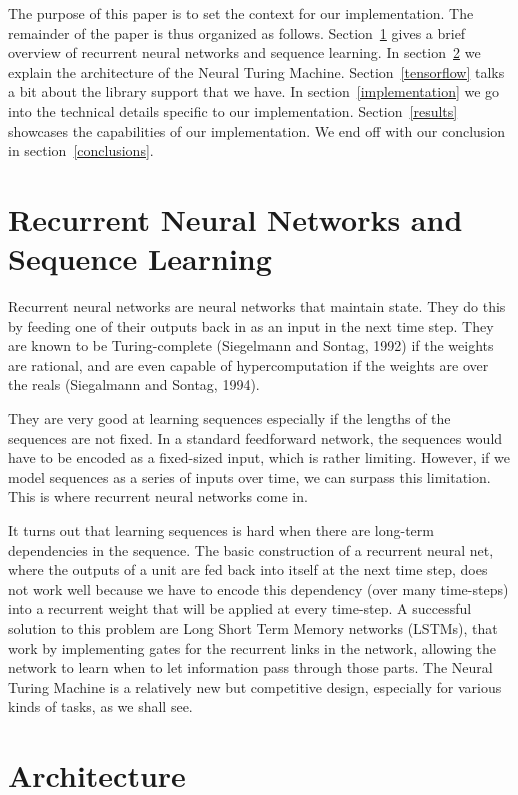 \documentclass[12pt]{article}
\begin{document}
The purpose of this paper is to set the context for our implementation.
The remainder of the paper is thus organized as follows.
Section~\ref{sequence} gives a brief overview of recurrent
neural networks and sequence learning.
In section~\ref{architecture} we explain the architecture of the Neural
Turing Machine. Section~\ref{tensorflow} talks a bit about the library
support that we have. In section~\ref{implementation} we
go into the technical details specific to our implementation.
Section~\ref{results} showcases the capabilities of our implementation.
We end off with our conclusion in section~\ref{conclusions}.

\section{Recurrent Neural Networks and Sequence Learning}\label{sequence}

Recurrent neural networks are neural networks that maintain state. They
do this by feeding one of their outputs back in as an input in the next time
step. They are known to be Turing-complete (Siegelmann and Sontag, 1992)\cite{Siegelmann:1992:CPN:130385.130432}
if the weights are rational, and are even capable of hypercomputation
if the weights are over the reals (Siegalmann and Sontag, 1994)\cite{SIEGELMANN1994331}.

They are very good at learning sequences especially if the lengths of
the sequences are not fixed. In a standard feedforward network, the
sequences would have to be encoded as a fixed-sized input, which is rather
limiting. However, if we model sequences as a series of inputs over time,
we can surpass this limitation. This is where recurrent neural networks come
in.

It turns out that learning sequences is hard when there are long-term
dependencies in the sequence. The basic construction of a recurrent
neural net, where the outputs of a unit are fed back into itself at the next
time step, does not work well because we have to encode this dependency
(over many time-steps) into a recurrent weight that will be applied at every
time-step. A successful solution to this problem are Long Short Term Memory
networks (LSTMs), that work by implementing gates for the recurrent 
links in the network, allowing the network to learn when to let information
pass through those parts. The Neural Turing Machine is a relatively new
but competitive design, especially for various kinds of tasks, as we
shall see.

\section{Architecture}\label{architecture}
\end{document}
